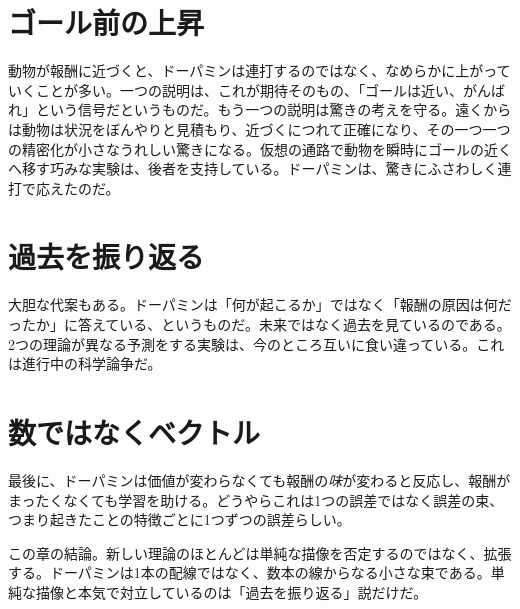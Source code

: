 \section*{ゴール前の上昇}

動物が報酬に近づくと、ドーパミンは連打するのではなく、なめらかに上がっていくことが多い。一つの説明は、これが期待そのもの、「ゴールは近い、がんばれ」という信号だというものだ。もう一つの説明は驚きの考えを守る。遠くからは動物は状況をぼんやりと見積もり、近づくにつれて正確になり、その一つ一つの精密化が小さなうれしい驚きになる。仮想の通路で動物を瞬時にゴールの近くへ移す巧みな実験は、後者を支持している。ドーパミンは、驚きにふさわしく連打で応えたのだ。

\section*{過去を振り返る}

大胆な代案もある。ドーパミンは「何が起こるか」ではなく「報酬の原因は何だったか」に答えている、というものだ。未来ではなく過去を見ているのである。2つの理論が異なる予測をする実験は、今のところ互いに食い違っている。これは進行中の科学論争だ。

\section*{数ではなくベクトル}

最後に、ドーパミンは価値が変わらなくても報酬の\emph{味}が変わると反応し、報酬がまったくなくても学習を助ける。どうやらこれは1つの誤差ではなく誤差の束、つまり起きたことの特徴ごとに1つずつの誤差らしい。

この章の結論。新しい理論のほとんどは単純な描像を否定するのではなく、拡張する。ドーパミンは1本の配線ではなく、数本の線からなる小さな束である。単純な描像と本気で対立しているのは「過去を振り返る」説だけだ。

